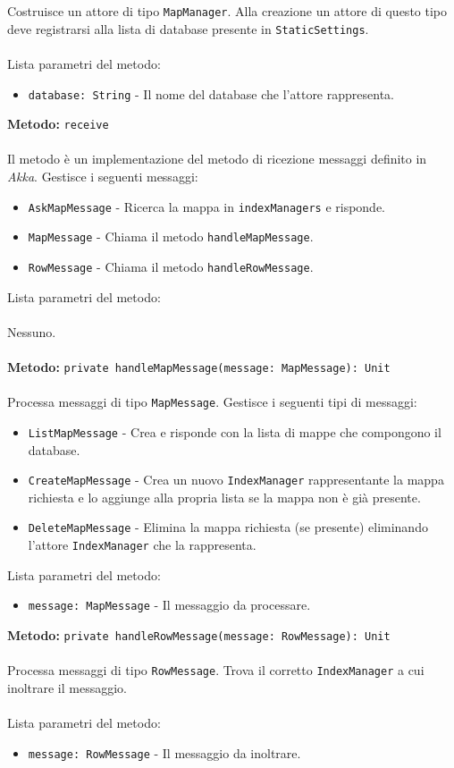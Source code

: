 \documentclass[a4paper]{article}
\begin{document}
			Costruisce un attore di tipo \texttt{MapManager}. Alla creazione un attore di questo tipo deve registrarsi alla lista di database presente in \texttt{StaticSettings}.
			\\ \\
			Lista parametri del metodo:
			\begin{itemize}
				\item \texttt{database: String} - Il nome del database che l'attore rappresenta.
			\end{itemize}
		\textbf{Metodo: }\texttt{receive}
			\\ \\
			Il metodo è un implementazione del metodo di ricezione messaggi definito in \emph{Akka}. Gestisce i seguenti messaggi:
			\begin{itemize}
				\item \texttt{AskMapMessage} - Ricerca la mappa in \texttt{indexManagers} e risponde.
				\item \texttt{MapMessage} - Chiama il metodo \texttt{handleMapMessage}.
				\item \texttt{RowMessage} - Chiama il metodo \texttt{handleRowMessage}.
			\end{itemize}
			Lista parametri del metodo:
			\\ \\
			Nessuno.
			\\ \\
		\textbf{Metodo: }\texttt{private handleMapMessage(message: MapMessage): Unit}
			\\ \\
			Processa messaggi di tipo \texttt{MapMessage}. Gestisce i seguenti tipi di messaggi:
			\begin{itemize}
				\item \texttt{ListMapMessage} - Crea e risponde con la lista di mappe che compongono il database.
				\item \texttt{CreateMapMessage} - Crea un nuovo \texttt{IndexManager} rappresentante la mappa richiesta e lo aggiunge alla propria lista se la mappa non è già presente.
				\item \texttt{DeleteMapMessage} - Elimina la mappa richiesta (se presente) eliminando l'attore \texttt{IndexManager} che la rappresenta.
			\end{itemize}
			Lista parametri del metodo:
			\begin{itemize}
				\item \texttt{message: MapMessage} - Il messaggio da processare.
			\end{itemize}
		\textbf{Metodo: }\texttt{private handleRowMessage(message: RowMessage): Unit}
			\\ \\
			Processa messaggi di tipo \texttt{RowMessage}. Trova il corretto \texttt{IndexManager} a cui inoltrare il messaggio.
			\\ \\
			Lista parametri del metodo:
			\begin{itemize}
				\item \texttt{message: RowMessage} - Il messaggio da inoltrare.
			\end{itemize}
			
\end{document}
